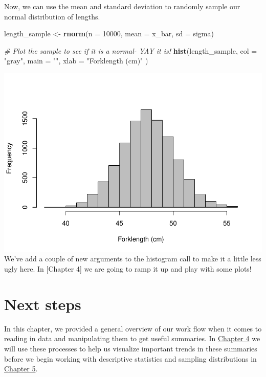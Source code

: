 \documentclass[
]{book}
\newenvironment{Shaded}{\begin{snugshade}}{\end{snugshade}}
\newcommand{\CommentTok}[1]{\textcolor[rgb]{0.56,0.35,0.01}{\textit{#1}}}
\newcommand{\DataTypeTok}[1]{\textcolor[rgb]{0.13,0.29,0.53}{#1}}
\newcommand{\DecValTok}[1]{\textcolor[rgb]{0.00,0.00,0.81}{#1}}
\newcommand{\KeywordTok}[1]{\textcolor[rgb]{0.13,0.29,0.53}{\textbf{#1}}}
\newcommand{\NormalTok}[1]{#1}
\newcommand{\StringTok}[1]{\textcolor[rgb]{0.31,0.60,0.02}{#1}}
\begin{document}
Now, we can use the mean and standard deviation to randomly sample our normal distribution of lengths.

\begin{Shaded}
\begin{Highlighting}[]
\NormalTok{length_sample <-}\StringTok{ }\KeywordTok{rnorm}\NormalTok{(}\DataTypeTok{n =} \DecValTok{10000}\NormalTok{, }\DataTypeTok{mean =}\NormalTok{ x_bar, }\DataTypeTok{sd =}\NormalTok{ sigma)}

\CommentTok{# Plot the sample to see if it is a normal- YAY it is!}
\KeywordTok{hist}\NormalTok{(length_sample,}
  \DataTypeTok{col =} \StringTok{"gray"}\NormalTok{,}
  \DataTypeTok{main =} \StringTok{""}\NormalTok{,}
  \DataTypeTok{xlab =} \StringTok{"Forklength (cm)"}
\NormalTok{)}
\end{Highlighting}
\end{Shaded}

\includegraphics{worstr_files/figure-latex/unnamed-chunk-83-1.pdf}
We've add a couple of new arguments to the histogram call to make it a little less ugly here. In {[}Chapter 4{]} we are going to ramp it up and play with some plots!

\hypertarget{next-steps}{%
\section{Next steps}\label{next-steps}}

In this chapter, we provided a general overview of our work flow when it comes to reading in data and manipulating them to get useful summaries. In \protect\hyperlink{Chapter4}{Chapter 4} we will use these processes to help us visualize important trends in these summaries before we begin working with descriptive statistics and sampling distributions in \protect\hyperlink{Chapter5}{Chapter 5}.
\end{document}
